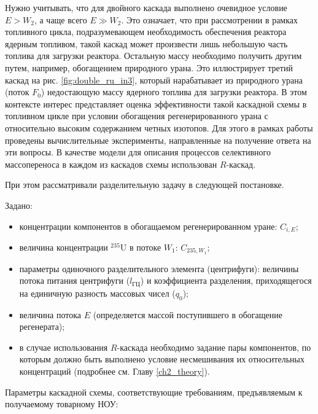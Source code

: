 Нужно учитывать, что для двойного каскада выполнено очевидное условие $E>W_2$, а чаще всего $E \gg W_2$. Это означает, что при рассмотрении в рамках топливного цикла, подразумевающем необходимость обеспечения реактора ядерным топливом, такой каскад может произвести лишь небольшую часть топлива для загрузки реактора. Остальную массу необходимо получить другим путем, например, обогащением природного урана. Это иллюстрирует третий каскад на рис. \ref{fig:double_ru_in3}, который нарабатывает из природного урана (поток $F_0$) недостающую массу ядерного топлива для загрузки реактора. В этом контексте интерес представляет оценка эффективности такой каскадной схемы в топливном цикле при условии обогащения регенерированного урана с относительно высоким содержанием четных изотопов. Для этого в рамках работы проведены вычислительные эксперименты, направленные на получение ответа на эти вопросы. В качестве модели для описания процессов селективного массопереноса в каждом из каскадов схемы использован $R$-каскад. 

При этом рассматривали разделительную задачу в следующей постановке.

Задано:

\begin{itemize}
    \item концентрации компонентов в обогащаемом регенерированном уране: $C_{i,{E}}$; 
    \item величина концентрации $^{235}$U в потоке $W_{1}$: $C_{235,{W_1}}$;
    \item параметры одиночного разделительного элемента (центрифуги): величины потока питания центрифуги ($l_{ГЦ}$) и коэффициента разделения, приходящегося на единичную разность массовых чисел ($q_{0}$);
    \item величина потока $E$ (определяется массой поступившего в обогащение регенерата);
    \item в случае использования $R$-каскада необходимо задание пары компонентов, по которым должно быть выполнено условие несмешивания их относительных концентраций (подробнее см. Главу \ref{ch2_theory}).
\end{itemize}

Параметры каскадной схемы, соответствующие требованиям, предъявляемым к получаемому товарному НОУ:

